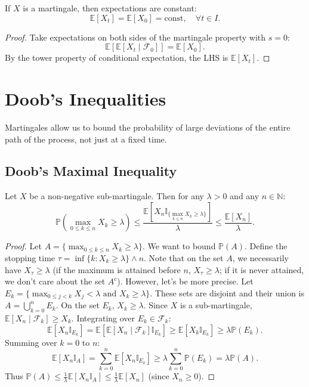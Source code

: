 \begin{proposition}
If $X$ is a martingale, then expectations are constant:
\[
\mathbb{E}[X_t] = \mathbb{E}[X_0] = \text{const}, \quad \forall t \in I.
\]
\end{proposition}
\begin{proof}
Take expectations on both sides of the martingale property with $s=0$:
\[
\mathbb{E}[ \mathbb{E}[X_t \mid \mathcal{F}_0] ] = \mathbb{E}[X_0].
\]
By the tower property of conditional expectation, the LHS is $\mathbb{E}[X_t]$.
\end{proof}

\section{Doob's Inequalities}

Martingales allow us to bound the probability of large deviations of the entire path of the process, not just at a fixed time.

\subsection{Doob's Maximal Inequality}

\begin{theorem}
Let $X$ be a non-negative sub-martingale. Then for any $\lambda > 0$ and any
$n \in \mathbb{N}$:
\[
\mathbb{P}\left( \max_{0 \le k \le n} X_k \ge \lambda \right) \le \frac{\mathbb{E}[X_n \mathbb{I}_{\{ \max_{k \le n} X_k \ge \lambda \}}]}{\lambda} \le \frac{\mathbb{E}[X_n]}{\lambda}.
\]
\end{theorem}

\begin{proof}
Let $A = \{ \max_{0 \le k \le n} X_k \ge \lambda \}$. We want to bound $\mathbb{P}(A)$.
Define the stopping time $\tau = \inf \{ k : X_k \ge \lambda \} \wedge n$.
Note that on the set $A$, we necessarily have $X_{\tau} \ge \lambda$ (if the maximum is attained before $n$, $X_{\tau} \ge \lambda$; if it is never attained, we don't care about the set $A^c$).
However, let's be more precise.
Let $E_k = \{ \max_{0 \le j < k} X_j < \lambda \text{ and } X_k \ge \lambda \}$. These sets are disjoint and their union is $A = \bigcup_{k=0}^n E_k$.
On the set $E_k$, $X_k \ge \lambda$.
Since $X$ is a sub-martingale, $\mathbb{E}[X_n \mid \mathcal{F}_k] \ge X_k$.
Integrating over $E_k \in \mathcal{F}_k$:
\[
\mathbb{E}[X_n \mathbb{I}_{E_k}] = \mathbb{E}[ \mathbb{E}[X_n \mid \mathcal{F}_k] \mathbb{I}_{E_k} ] \ge \mathbb{E}[ X_k \mathbb{I}_{E_k} ] \ge \lambda \mathbb{P}(E_k).
\]
Summing over $k=0$ to $n$:
\[
\mathbb{E}[X_n \mathbb{I}_A] = \sum_{k=0}^n \mathbb{E}[X_n \mathbb{I}_{E_k}] \ge \lambda \sum_{k=0}^n \mathbb{P}(E_k) = \lambda \mathbb{P}(A).
\]
Thus $\mathbb{P}(A) \le \frac{1}{\lambda} \mathbb{E}[X_n \mathbb{I}_A] \le \frac{1}{\lambda} \mathbb{E}[X_n]$ (since $X_n \ge 0$).
\end{proof}

